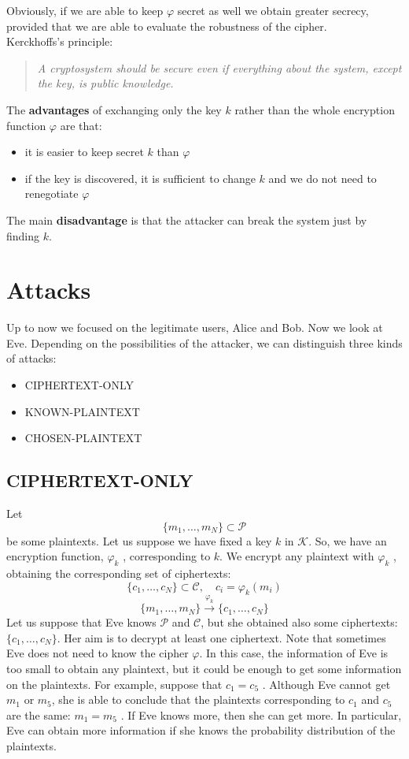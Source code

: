 \documentclass[a4paper, 10pt, titlepage]{article}
\begin{document}
Obviously, if we are able to keep $\varphi$ secret as well we obtain greater secrecy, provided that we are able to evaluate the robustness of the cipher. \\
Kerckhoffs’s principle:
\begin{quote}
\textit{A cryptosystem should be secure even if everything about the
system, except the key, is public knowledge.}
\end{quote}
The \textbf{advantages} of exchanging only the key $k$ rather than the whole
encryption function $\varphi$ are that:
\begin{itemize}
\item it is easier to keep secret $k$ than $\varphi$
\item if the key is discovered, it is sufficient to change $k$ and we do not need to renegotiate $\varphi$
\end{itemize}
The main \textbf{disadvantage} is that the attacker can break the system just by finding $k$.

\newpage
\section{Attacks}
Up to now we focused on the legitimate users, Alice and Bob. Now we
look at Eve. Depending on the possibilities of the attacker, we can distinguish three kinds of attacks:
\begin{itemize}
\item CIPHERTEXT-ONLY
\item KNOWN-PLAINTEXT
\item CHOSEN-PLAINTEXT
\end{itemize}
\subsection{CIPHERTEXT-ONLY}
Let
$$\{m_1, \dots, m_N\} \subset \mathcal{P}$$
be some plaintexts. Let us suppose we have fixed a key $k$ in $\mathcal{K}$. So, we have an encryption function, $\varphi_k$ , corresponding to $k$. We encrypt any plaintext with $\varphi_k$ , obtaining the corresponding set of ciphertexts:
$$\{c_1, \dots, c_N\} \subset \mathcal{C}, \quad c_i = \varphi_k(m_i)$$
$$\{m_1, \dots, m_N\} \overset{\varphi_k}\longrightarrow \{c_1, \dots, c_N\}$$
Let us suppose that Eve knows $\mathcal{P}$ and $\mathcal{C}$, but she obtained also some
ciphertexts: $\{c_1, \dots, c_N\}$.
Her aim is to decrypt at least one ciphertext.
Note that sometimes Eve does not need to know the cipher $\varphi$.
In this case, the information of Eve is too small to obtain any plaintext, but it could be enough to get some information on the plaintexts. For example, suppose that $c_1 = c_5$ . Although Eve cannot get $m_1$ or $m_5$, she is able to conclude that the plaintexts corresponding to $c_1$ and $c_5$ are the same: $m_1 = m_5$ . If Eve knows more, then she can get more. In particular, Eve can obtain more information if she knows the probability distribution of the plaintexts.
\end{document}
